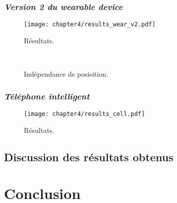 \subsubsection{\textit{Version 2 du wearable device}}

\begin{figure}[H]
	\centering
	\texttt{[image: chapter4/results\_wear\_v2.pdf]}
        \caption{Résultats.}
	\label{fig:results_wear_v2}
\end{figure}

\begin{figure}[H]
    \centering
    \\[20pt]
    \caption{Indépendance de posisition.}
    \label{fig:pos_ind_wear_v2}
\end{figure}

\subsubsection{\textit{Téléphone intelligent}}

\begin{figure}[H]
	\centering
	\texttt{[image: chapter4/results\_cell.pdf]}
        \caption{Résultats.}
	\label{fig:results_cell}
\end{figure}

\subsection{Discussion des résultats obtenus}

\section{Conclusion}